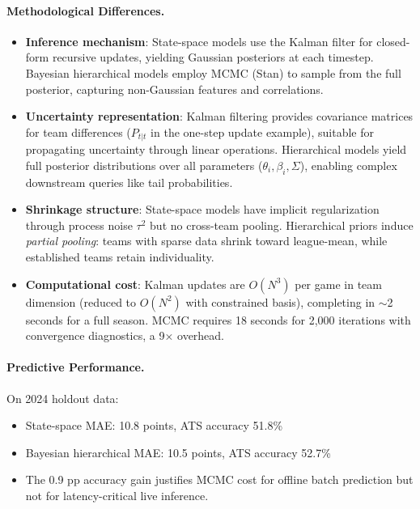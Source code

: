 \paragraph{Methodological Differences.}
\begin{itemize}
  \item \textbf{Inference mechanism}: State-space models use the Kalman filter for closed-form recursive updates, yielding Gaussian posteriors at each timestep. Bayesian hierarchical models employ MCMC (Stan) to sample from the full posterior, capturing non-Gaussian features and correlations.
  \item \textbf{Uncertainty representation}: Kalman filtering provides covariance matrices for team differences ($P_{t|t}$ in the one-step update example), suitable for propagating uncertainty through linear operations. Hierarchical models yield full posterior distributions over all parameters ($\theta_i, \beta_i, \Sigma$), enabling complex downstream queries like tail probabilities.
  \item \textbf{Shrinkage structure}: State-space models have implicit regularization through process noise $\tau^2$ but no cross-team pooling. Hierarchical priors induce \emph{partial pooling}: teams with sparse data shrink toward league-mean, while established teams retain individuality.
  \item \textbf{Computational cost}: Kalman updates are $O(N^3)$ per game in team dimension (reduced to $O(N^2)$ with constrained basis), completing in $\sim$2 seconds for a full season. MCMC requires 18 seconds for 2,000 iterations with convergence diagnostics, a 9× overhead.
\end{itemize}

\paragraph{Predictive Performance.}
On 2024 holdout data:
\begin{itemize}
  \item State-space MAE: 10.8 points, ATS accuracy 51.8\%
  \item Bayesian hierarchical MAE: 10.5 points, ATS accuracy 52.7\%
  \item The 0.9 pp accuracy gain justifies MCMC cost for offline batch prediction but not for latency-critical live inference.
\end{itemize}

